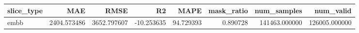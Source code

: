 \begin{tabular}{lrrrrrrr}
\toprule
slice_type & MAE & RMSE & R2 & MAPE & mask_ratio & num_samples & num_valid \\
\midrule
embb & 2404.573486 & 3652.797607 & -10.253635 & 94.729393 & 0.890728 & 141463.000000 & 126005.000000 \\
\bottomrule
\end{tabular}
